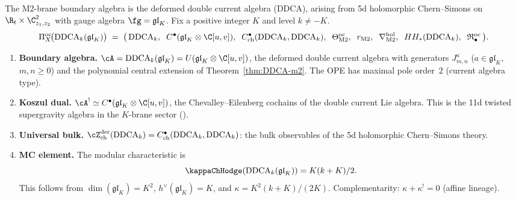 \begin{computation}
\label{comp:platonic-M2}
The M2-brane boundary algebra is the deformed double current
algebra (DDCA), arising from 5d holomorphic Chern--Simons on
$\R_t \times \C^2_{z_1,z_2}$ with gauge algebra
$\fg = \mathfrak{gl}_K$. Fix a positive integer $K$ and level
$k \ne -K$.
\begin{equation}\label{eq:platonic-M2}
\Pi^{\mathrm{oc}}_X\!\bigl(\mathrm{DDCA}_k(\mathfrak{gl}_K)\bigr)
\;=\;
\bigl(\,
\mathrm{DDCA}_k,\;\;
C^\bullet(\mathfrak{gl}_K \otimes \C[u,v]),\;\;
C^\bullet_{\mathrm{ch}}(\mathrm{DDCA}_k, \mathrm{DDCA}_k),\;\;
\Theta^{\mathrm{oc}}_{\mathrm{M2}},\;\;
r_{\mathrm{M2}},\;\;
\nabla^{\mathrm{hol}}_{\mathrm{M2}},\;\;
HH_*(\mathrm{DDCA}_k),\;\;
\mathfrak{R}^{\mathrm{oc}}_\bullet
\,\bigr).
\end{equation}
\begin{enumerate}[label=\textup{(\roman*)},nosep]
\item \textbf{Boundary algebra.}
 $\cA = \mathrm{DDCA}_k(\mathfrak{gl}_K) = U(\mathfrak{gl}_K \otimes \C[u,v])$,
 the deformed double current algebra with generators
 $J^a_{m,n}$ ($a \in \mathfrak{gl}_K$, $m,n \ge 0$)
 and the polynomial central extension of
 Theorem~\textup{\ref{thm:DDCA-m2}}.
 The OPE has maximal pole order~$2$ (current algebra type).

\item \textbf{Koszul dual.}
 $\cA^! \simeq C^\bullet(\mathfrak{gl}_K \otimes \C[u,v])$,
 the Chevalley--Eilenberg cochains of the double current Lie
 algebra. This is the 11d twisted supergravity algebra in the
 $K$-brane sector \textup{(}\cite{Costello-1705.02500v1}\textup{)}.

\item \textbf{Universal bulk.}
 $\cZ^{\mathrm{der}}_{\mathrm{ch}}(\mathrm{DDCA}_k)
 = C^\bullet_{\mathrm{ch}}(\mathrm{DDCA}_k, \mathrm{DDCA}_k)$:
 the bulk observables of the 5d holomorphic Chern--Simons
 theory.

\item \textbf{MC element.}
 The modular characteristic is
 \begin{equation}\label{eq:platonic-kappa-M2}
 \kappaChHodge(\mathrm{DDCA}_k(\mathfrak{gl}_K)) = K(k + K)/2.
 \end{equation}
 This follows from $\dim(\mathfrak{gl}_K) = K^2$,
 $h^\vee(\mathfrak{gl}_K) = K$, and
 $\kappa = K^2(k + K)/(2K)$.
 Complementarity: $\kappa + \kappa^! = 0$ (affine lineage).


\end{enumerate}
\end{computation}
